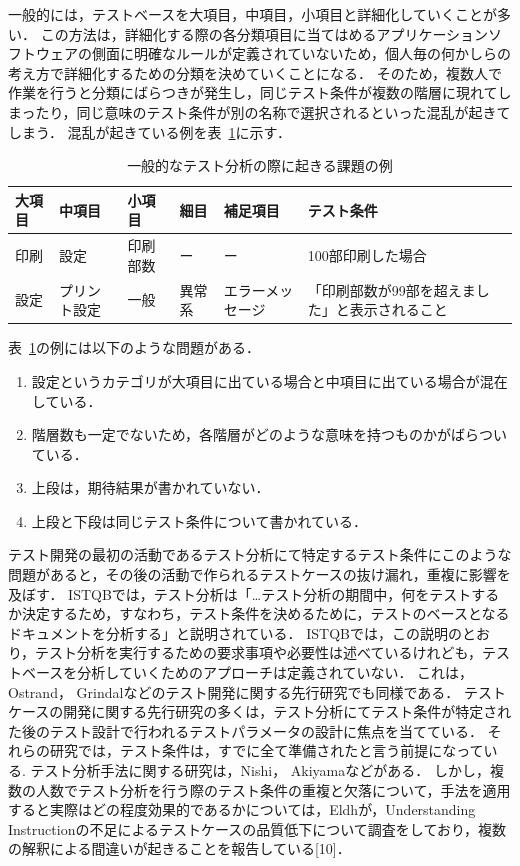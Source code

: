 一般的には，テストベースを大項目，中項目，小項目と詳細化していくことが多い．
この方法は，詳細化する際の各分類項目に当てはめるアプリケーションソフトウェアの側面に明確なルールが定義されていないため，個人毎の何かしらの考え方で詳細化するための分類を決めていくことになる．
そのため，複数人で作業を行うと分類にばらつきが発生し，同じテスト条件が複数の階層に現れてしまったり，同じ意味のテスト条件が別の名称で選択されるといった混乱が起きてしまう．
混乱が起きている例を表~\ref{tab:analysissample}に示す．
\begin{table}[htbp]
  \centering
  \caption{一般的なテスト分析の際に起きる課題の例}
    \begin{tabular}{|l|l|l|l|l|p{7.5em}|}
    \hline
    大項目   & 中項目   & 小項目   & 細目    & 補足項目  & テスト条件 \bigstrut\\
    \hline
    印刷    & 設定    & 印刷部数  & ー     & ー     & 100部印刷した場合 \bigstrut\\
    \hline
    設定    & プリント設定 & 一般    & 異常系   & エラーメッセージ & 「印刷部数が99部を超えました」と表示されること \bigstrut\\
    \hline
    \end{tabular}%
  \label{tab:analysissample}%
\end{table}%
表~\ref{tab:analysissample}の例には以下のような問題がある．
\begin{enumerate}
\item 設定というカテゴリが大項目に出ている場合と中項目に出ている場合が混在している．
\item 階層数も一定でないため，各階層がどのような意味を持つものかがばらついている．
\item 上段は，期待結果が書かれていない．
\item 上段と下段は同じテスト条件について書かれている．
\end{enumerate}
テスト開発の最初の活動であるテスト分析にて特定するテスト条件にこのような問題があると，その後の活動で作られるテストケースの抜け漏れ，重複に影響を及ぼす．
ISTQBでは，テスト分析は「…テスト分析の期間中，何をテストするか決定するため，すなわち，テスト条件を決めるために，テストのベースとなるドキュメントを分析する」と説明されている．
ISTQBでは，この説明のとおり，テスト分析を実行するための要求事項や必要性は述べているけれども，テストベースを分析していくためのアプローチは定義されていない．
これは，Ostrand\cite{Ostrand:1988:CMS:62959.62964}， Grindal\cite{Grindal:2007:IPM:1332044.1332085}などのテスト開発に関する先行研究でも同様である．
テストケースの開発に関する先行研究の多くは，テスト分析にてテスト条件が特定された後のテスト設計で行われるテストパラメータの設計に焦点を当てている．
それらの研究では，テスト条件は，すでに全て準備されたと言う前提になっている.
テスト分析手法に関する研究は，Nishi\cite{nishi2012based}， Akiyama\cite{Akiyama2014}などがある．
しかし，複数の人数でテスト分析を行う際のテスト条件の重複と欠落について，手法を適用すると実際はどの程度効果的であるかについては，Eldhが，Understanding Instructionの不足によるテストケースの品質低下について調査をしており，複数の解釈による間違いが起きることを報告している[10]．


